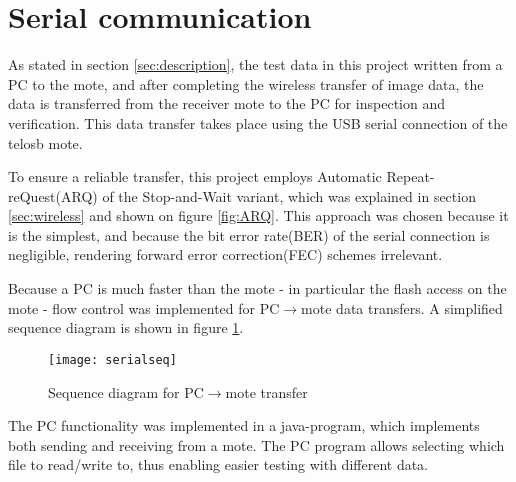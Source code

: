 \section{Serial communication}

As stated in section \ref{sec:description}, the test data in this project written from a PC to the mote, and after completing the wireless transfer of image data, the data is transferred from the receiver mote to the PC for inspection and verification. This data transfer takes place using the USB serial connection of the telosb mote.

To ensure a reliable transfer, this project employs Automatic Repeat-reQuest(ARQ) of the Stop-and-Wait variant, which was explained in section \ref{sec:wireless} and shown on figure \ref{fig:ARQ}. This approach was chosen because it is the simplest, and because the bit error rate(BER) of the serial connection is negligible, rendering forward error correction(FEC) schemes irrelevant.

Because a PC is much faster than the mote - in particular the flash access on the mote - flow control was implemented for PC$\rightarrow$mote data transfers. A simplified sequence diagram is shown in figure \ref{fig:serialseq}.

\begin{figure}
\centering
\texttt{[image: serialseq]}
\caption{Sequence diagram for PC$\rightarrow$mote transfer}
\label{fig:serialseq}
\end{figure}

The PC functionality was implemented in a java-program, which implements both sending and receiving from a mote. The PC program allows selecting which file to read/write to, thus enabling easier testing with different data.


